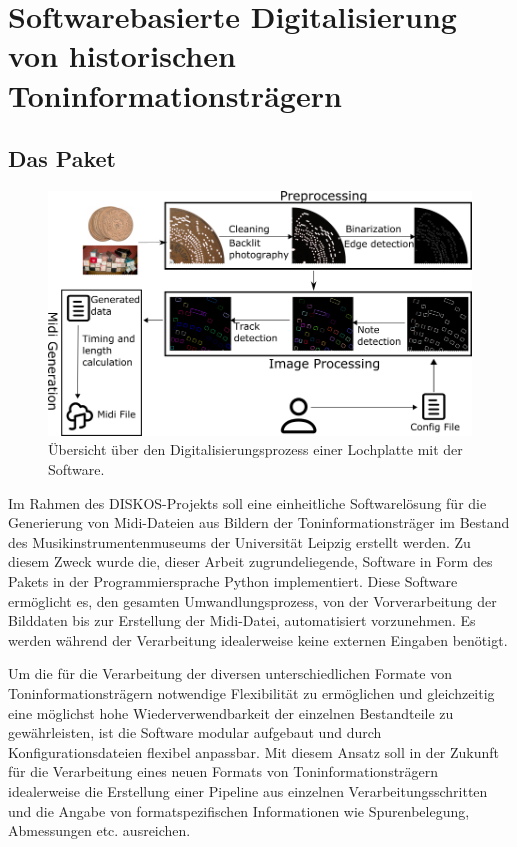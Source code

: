 \FloatBarrier

\section{Softwarebasierte Digitalisierung von historischen Toninformationsträgern}

\subsection{Das  Paket}

\begin{figure}[t]
    \centering
    \includegraphics[width=\textwidth]{graphics/flow_diagram.png}
    \caption{Übersicht über den Digitalisierungsprozess einer Lochplatte mit der  Software.}
    \label{softwareworkflow}
\end{figure}

Im Rahmen des DISKOS-Projekts soll eine einheitliche Softwarelösung für die Generierung von Midi-Dateien aus Bildern der Toninformationsträger im Bestand des Musikinstrumentenmuseums der Universität Leipzig erstellt werden.
Zu diesem Zweck wurde die, dieser Arbeit zugrundeliegende, Software in Form des  Pakets in der Programmiersprache Python \parencite[]{van1995python} implementiert.
Diese Software ermöglicht es, den gesamten Umwandlungsprozess, von der Vorverarbeitung der Bilddaten bis zur Erstellung der Midi-Datei, automatisiert vorzunehmen.
Es werden während der Verarbeitung idealerweise keine externen Eingaben benötigt.

Um die für die Verarbeitung der diversen unterschiedlichen Formate von Toninformationsträgern notwendige Flexibilität zu ermöglichen und gleichzeitig eine möglichst hohe Wiederverwendbarkeit der einzelnen Bestandteile zu gewährleisten, ist die Software modular aufgebaut und durch Konfigurationsdateien flexibel anpassbar.
Mit diesem Ansatz soll in der Zukunft für die Verarbeitung eines neuen Formats von Toninformationsträgern idealerweise die Erstellung einer Pipeline aus einzelnen Verarbeitungsschritten und die Angabe von formatspezifischen Informationen wie Spurenbelegung, Abmessungen etc. ausreichen.

